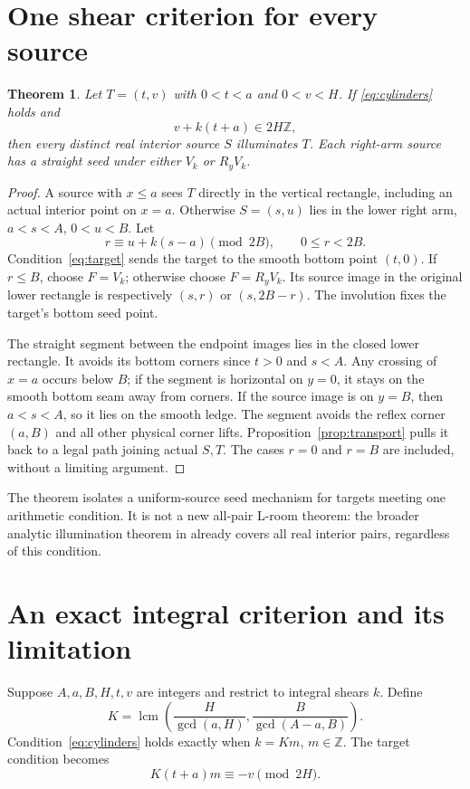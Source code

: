 \documentclass[11pt]{article}
\newtheorem{theorem}{Theorem}[section]
\theoremstyle{definition}
\newcommand{\Z}{\mathbb Z}
\newcommand{\lcm}{\operatorname{lcm}}
\begin{document}
\section{One shear criterion for every source}
\begin{theorem}\label{thm:uniform}
Let $T=(t,v)$ with $0<t<a$ and $0<v<H$. If \eqref{eq:cylinders} holds and
\begin{equation}\label{eq:target}
 v+k(t+a)\in2H\Z,
\end{equation}
then every distinct real interior source $S$ illuminates $T$. Each right-arm source has a straight seed under either $V_k$ or $R_yV_k$.
\end{theorem}
\begin{proof}
A source with $x\le a$ sees $T$ directly in the vertical rectangle, including an actual interior point on $x=a$. Otherwise $S=(s,u)$ lies in the lower right arm, $a<s<A$, $0<u<B$. Let
\[
 r\equiv u+k(s-a)\pmod{2B},\qquad 0\le r<2B.
\]
Condition~\eqref{eq:target} sends the target to the smooth bottom point $(t,0)$. If $r\le B$, choose $F=V_k$; otherwise choose $F=R_yV_k$. Its source image in the original lower rectangle is respectively $(s,r)$ or $(s,2B-r)$. The involution fixes the target's bottom seed point.

The straight segment between the endpoint images lies in the closed lower rectangle. It avoids its bottom corners since $t>0$ and $s<A$. Any crossing of $x=a$ occurs below $B$; if the segment is horizontal on $y=0$, it stays on the smooth bottom seam away from corners. If the source image is on $y=B$, then $a<s<A$, so it lies on the smooth ledge. The segment avoids the reflex corner $(a,B)$ and all other physical corner lifts. Proposition~\ref{prop:transport} pulls it back to a legal path joining actual $S,T$. The cases $r=0$ and $r=B$ are included, without a limiting argument.
\end{proof}

The theorem isolates a uniform-source seed mechanism for targets meeting one arithmetic condition. It is not a new all-pair L-room theorem: the broader analytic illumination theorem in \cite{eightwall} already covers all real interior pairs, regardless of this condition.

\section{An exact integral criterion and its limitation}
Suppose $A,a,B,H,t,v$ are integers and restrict to integral shears $k$. Define
\[
 K=\lcm\left(\frac{H}{\gcd(a,H)},\frac{B}{\gcd(A-a,B)}\right).
\]
Condition~\eqref{eq:cylinders} holds exactly when $k=Km$, $m\in\Z$. The target condition becomes
\[
 K(t+a)m\equiv-v\pmod{2H}.
\]
\end{document}
